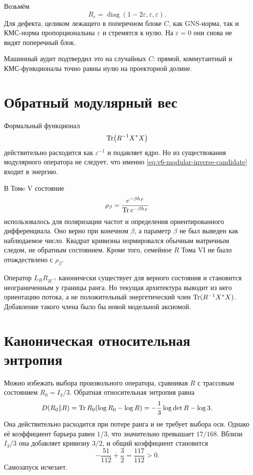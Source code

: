 Возьмём
\begin{equation}
 R_\varepsilon
 =\operatorname{diag}(1-2\varepsilon,\varepsilon,\varepsilon).
\end{equation}
Для дефекта, целиком лежащего в поперечном блоке $C$, как GNS-норма, так
и КМС-норма пропорциональны $\varepsilon$ и стремятся к нулю. На
$\varepsilon=0$ они снова не видят поперечный блок.

Машинный аудит подтвердил это на случайных $C$: прямой, коммутантный и
КМС-функционалы точно равны нулю на проекторной долине.

\section{Обратный модулярный вес}

Формальный функционал
\begin{equation}
 \operatorname{Tr}\bigl(R^{-1}X^*X\bigr)
 \label{eq:v6-modular-inverse-candidate}
\end{equation}
действительно расходится как $\varepsilon^{-1}$ и подавляет ядро. Но из
существования модулярного оператора не следует, что именно
\eqref{eq:v6-modular-inverse-candidate} входит в энергию.

В Томe V состояние
\begin{equation}
 \rho_\beta=\frac{e^{-\beta h_F}}{\operatorname{Tr} e^{-\beta h_F}}
\end{equation}
использовалось для поляризации частот и определения ориентированного
дифференциала. Оно верно при конечном $\beta$, а параметр $\beta$ не был
выведен как наблюдаемое число. Квадрат кривизны нормировался обычным
матричным следом, не обратным состоянием. Кроме того, семейное $R$ Тома VI
не было отождествлено с $\rho_\beta$.

\begin{theorem}
Оператор $L_RR_{R^{-1}}$ канонически существует для верного состояния и
становится неограниченным у границы ранга. Но текущая архитектура выводит
из него ориентацию потока, а не положительный энергетический член
$\operatorname{Tr}(R^{-1}X^*X)$. Добавление такого члена было бы новой модельной
аксиомой.
\end{theorem}

\section{Каноническая относительная энтропия}

Можно избежать выбора произвольного оператора, сравнивая $R$ с
трассовым состоянием $R_0=I_3/3$. Обратная относительная энтропия равна
\begin{equation}
 D(R_0\|R)
 =\operatorname{Tr} R_0(\log R_0-\log R)
 =-\frac13\log\det R-\log3.
 \label{eq:v6-modular-relative-entropy-barrier}
\end{equation}
Она действительно расходится при потере ранга и не требует выбора оси.
Однако её коэффициент барьера равен $1/3$, что значительно превышает
$17/168$. Вблизи $I_3/3$ она добавляет кривизну $3/2$, и общий коэффициент
становится
\begin{equation}
 -\frac{51}{112}+\frac32
 =\frac{117}{112}>0.
\end{equation}
Самозапуск исчезает.

